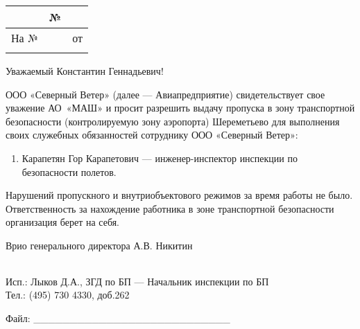 \documentclass{article}
\date{} %
\begin{document}
\begin{longtable}[]{@{}lll@{}}
\toprule
& № & \\
\midrule
\endhead
На № & & от \\
& \\
\bottomrule
\end{longtable}

Уважаемый Константин Геннадьевич!

ООО «Северный Ветер» (далее — Авиапредприятие) свидетельствует свое уважение АО~«МАШ» и просит разрешить выдачу пропуска в зону транспортной безопасности (контролируемую зону аэропорта) Шереметьево для выполнения своих служебных обязанностей сотруднику ООО «Северный Ветер»:

\begin{enumerate}
\item
  Карапетян Гор Карапетович — инженер-инспектор инспекции по безопасности полетов.
\end{enumerate}

Нарушений пропускного и внутриобъектового режимов за время работы не было. Ответственность за нахождение работника в зоне транспортной безопасности организация берет на себя.

Врио генерального директора А.В. Никитин

\begin{longtable}[]{@{}l@{}}
\toprule
\bottomrule
\end{longtable}

Исп.: Лыков Д.А., ЗГД по БП — Начальник инспекции по БП\\
Тел.: (495) 730 4330, доб.262

Файл: \_\_\_\_\_\_\_\_\_\_\_\_\_\_\_\_\_\_\_\_\_\_\_\_\_\_\_
\end{document}
